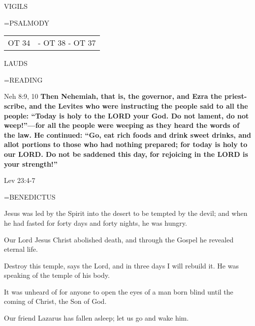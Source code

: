 \begin{flushleft}\normalsize VIGILS\\\end{flushleft}

\hangindent=\parindent \small{PSALMODY}
\begin{center}
\begin{tabular}{ l l }
OT 34 &  - OT 38 - OT 37\\
\end{tabular}
\end{center}		

\begin{flushleft}\normalsize LAUDS\\\end{flushleft}

\hangindent=\parindent \small READING
\begin{description}[labelindent=\parindent, leftmargin=*]
\item [Weeks 1-4:]     Neh 8:9, 10 \textbf{    Then Nehemiah, that is, the governor, and Ezra the priest-scribe, and the Levites who were instructing the people said to all the people: “Today is holy to the LORD your God. Do not lament, do not weep!”—for all the people were weeping as they heard the words of the law. He continued: “Go, eat rich foods and drink sweet drinks, and allot portions to those who had nothing prepared; for today is holy to our LORD. Do not be saddened this day, for rejoicing in the LORD is your strength!” \\}
\item [Week 5:]   Lev 23:4-7 \textbf{  \\}
\end{description}

\hangindent=\parindent \small BENEDICTUS
\begin{description}[labelindent=\parindent, leftmargin=*]
\item [Week 1:] 	Jesus was led by the Spirit into the desert to be tempted by the devil; and when he had fasted for forty days and forty nights, he was hungry.
\item [Week 2:] 	Our Lord Jesus Christ abolished death, and through the Gospel he revealed eternal life.
\item [Week 3:] 	Destroy this temple, says the Lord, and in three days I will rebuild it. He was speaking of the temple of his body.
\item [Week 4:] 	It was unheard of for anyone to open the eyes of a man born blind until the coming of Christ, the Son of God.
\item [Week 5:] 	Our friend Lazarus has fallen asleep; let us go and wake him.
\end{description}

